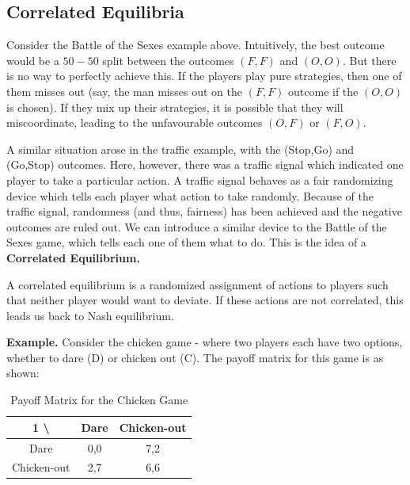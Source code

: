 \documentclass{article}
\theoremstyle{definition}
\begin{document}
\subsection{Correlated Equilibria}

Consider the Battle of the Sexes example above. Intuitively, the best outcome would be a $50-50$ split between the outcomes $(F,F)$ and $(O,O)$. But there is no way to perfectly achieve this. If the players play pure strategies, then one of them misses out (say, the man misses out on the $(F,F)$ outcome if the $(O,O)$ is chosen). If they mix up their strategies, it is possible that they will miscoordinate, leading to the unfavourable outcomes $(O,F)$ or $(F,O)$. \smallskip

A similar situation arose in the traffic example, with the (Stop,Go) and (Go,Stop) outcomes. Here, however, there was a traffic signal which indicated one player to take a particular action. A traffic signal behaves as a fair randomizing device which tells each player what action to take randomly. Because of the traffic signal, randomness (and thus, fairness) has been achieved and the negative outcomes are ruled out. We can introduce a similar device to the Battle of the Sexes game, which tells each one of them what to do. This is the idea of a \textbf{Correlated Equilibrium.} \smallskip

A correlated equilibrium is a randomized assignment of actions to players such that neither player would want to deviate. If these actions are not correlated, this leads us back to Nash equilibrium. \smallskip

\textbf{Example.} Consider the chicken game - where two players each have two options, whether to dare (D) or chicken out (C). The payoff matrix for this game is as shown: \medskip

\begin{table}[H]
    \begin{adjustbox}{width=5cm,center}
    \begin{tabular}{|c|c|c|}
        \hline
        1 \textbackslash \: 2 & Dare & Chicken-out \\
        \hline
        Dare & 0,0 & 7,2 \\
        \hline 
        Chicken-out & 2,7 & 6,6  \\
        \hline
    \end{tabular}
    \end{adjustbox}
    \caption{Payoff Matrix for the Chicken Game}
    \label{table:chicken}
\end{table}
\end{document}
